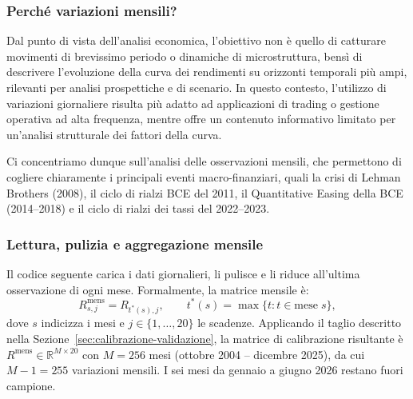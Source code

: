 \documentclass[11pt,a4paper]{article}
\theoremstyle{plain}
\theoremstyle{definition}
\theoremstyle{remark}
\begin{document}
\subsubsection{Perché variazioni mensili?}
\label{sec:motivazione-mensile}

Dal punto di vista dell'analisi economica, l'obiettivo non è quello di catturare movimenti
di brevissimo periodo o dinamiche di microstruttura, bensì di descrivere l'evoluzione della
curva dei rendimenti su orizzonti temporali più ampi, rilevanti per analisi prospettiche e
di scenario. In questo contesto, l'utilizzo di variazioni giornaliere risulta più adatto ad
applicazioni di trading o gestione operativa ad alta frequenza, mentre offre un contenuto
informativo limitato per un'analisi strutturale dei fattori della curva.

Ci concentriamo dunque sull'analisi delle osservazioni mensili, che permettono di cogliere chiaramente i principali eventi
macro-finanziari, quali la crisi di Lehman Brothers (2008), il ciclo di rialzi
BCE del 2011, il Quantitative Easing della BCE (2014--2018) e il ciclo di
rialzi dei tassi del 2022--2023.

\subsubsection{Lettura, pulizia e aggregazione mensile}
\label{sec:aggregazione}

Il codice seguente carica i dati giornalieri, li pulisce e li riduce all'ultima
osservazione di ogni mese. Formalmente, la matrice mensile è:
\[
R^{\text{mens}}_{s,j} = R_{t^*(s),j}, \qquad
t^*(s) = \max\{t : t \in \text{mese}\; s\},
\]
dove $s$ indicizza i mesi e $j \in \{1,\ldots,20\}$ le scadenze.
Applicando il taglio descritto nella
Sezione~\ref{sec:calibrazione-validazione}, la matrice di calibrazione
risultante è $R^{\text{mens}} \in \mathbb{R}^{M \times 20}$ con $M = 256$
mesi (ottobre 2004 -- dicembre 2025), da cui $M-1 = 255$ variazioni mensili.
I sei mesi da gennaio a giugno 2026 restano fuori campione.
\end{document}

